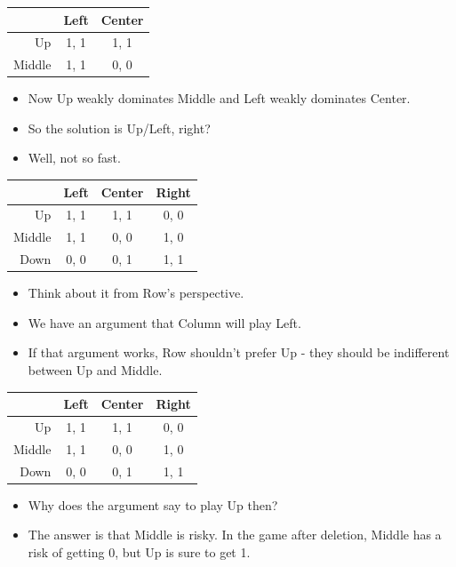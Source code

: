 \documentclass[
  14pt,
  letterpaper,
  ignorenonframetext,
  aspectratio=169,
]{beamer}
\providecommand{\tightlist}{%
  \setlength{\itemsep}{0pt}\setlength{\parskip}{0pt}}\usepackage{longtable,booktabs,array}
\let\olditem\item
\renewcommand{\item}{%
\olditem\vspace{6pt}}
\begin{document}
\begin{frame}
\begin{table}[!h]
\centering
\begin{tabular}[t]{>{}r|cc}
\toprule
 & Left & Center\\
\midrule
Up & 1, 1 & 1, 1\\
Middle & 1, 1 & 0, 0\\
\bottomrule
\end{tabular}
\end{table}

\begin{itemize}[<+->]
\tightlist
\item
  Now Up weakly dominates Middle and Left weakly dominates Center.
\item
  So the solution is Up/Left, right?
\item
  Well, not so fast.
\end{itemize}
\end{frame}

\begin{frame}
\begin{table}[!h]
\centering
\begin{tabular}[t]{>{}r|ccc}
\toprule
 & Left & Center & Right\\
\midrule
Up & 1, 1 & 1, 1 & 0, 0\\
Middle & 1, 1 & 0, 0 & 1, 0\\
Down & 0, 0 & 0, 1 & 1, 1\\
\bottomrule
\end{tabular}
\end{table}

\begin{itemize}[<+->]
\tightlist
\item
  Think about it from Row's perspective.
\item
  We have an argument that Column will play Left.
\item
  If that argument works, Row shouldn't prefer Up - they should be
  indifferent between Up and Middle.
\end{itemize}
\end{frame}

\begin{frame}
\begin{table}[!h]
\centering
\begin{tabular}[t]{>{}r|ccc}
\toprule
 & Left & Center & Right\\
\midrule
Up & 1, 1 & 1, 1 & 0, 0\\
Middle & 1, 1 & 0, 0 & 1, 0\\
Down & 0, 0 & 0, 1 & 1, 1\\
\bottomrule
\end{tabular}
\end{table}

\begin{itemize}[<+->]
\tightlist
\item
  Why does the argument say to play Up then?
\item
  The answer is that Middle is risky. In the game after deletion, Middle
  has a risk of getting 0, but Up is sure to get 1.
\end{itemize}
\end{frame}
\end{document}
